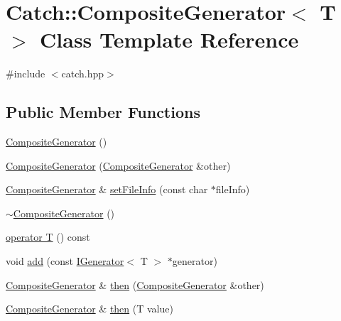 \hypertarget{classCatch_1_1CompositeGenerator}{\section{Catch\-:\-:Composite\-Generator$<$ T $>$ Class Template Reference}
\label{classCatch_1_1CompositeGenerator}
}


{\ttfamily \#include $<$catch.\-hpp$>$}

\subsection*{Public Member Functions}
\begin{DoxyCompactItemize}
\item 
\hyperlink{classCatch_1_1CompositeGenerator_a923398b140371d1783858766864a1af5}{Composite\-Generator} ()
\item 
\hyperlink{classCatch_1_1CompositeGenerator_a21a7070a00e4a6fe021294c356692692}{Composite\-Generator} (\hyperlink{classCatch_1_1CompositeGenerator}{Composite\-Generator} \&other)
\item 
\hyperlink{classCatch_1_1CompositeGenerator}{Composite\-Generator} \& \hyperlink{classCatch_1_1CompositeGenerator_ac3c57cf4ca5472f440bf71e2936bcd4a}{set\-File\-Info} (const char $\ast$file\-Info)
\item 
\hyperlink{classCatch_1_1CompositeGenerator_a5766205abd7004c508c20ddbb5e5555e}{$\sim$\-Composite\-Generator} ()
\item 
\hyperlink{classCatch_1_1CompositeGenerator_aa3f627d84fb256df0404d19d7fd4b784}{operator T} () const 
\item 
void \hyperlink{classCatch_1_1CompositeGenerator_af3774d42ad2d3453d089ca599efe0517}{add} (const \hyperlink{structCatch_1_1IGenerator}{I\-Generator}$<$ T $>$ $\ast$generator)
\item 
\hyperlink{classCatch_1_1CompositeGenerator}{Composite\-Generator} \& \hyperlink{classCatch_1_1CompositeGenerator_a2e03f42df85cdd238aabd77a80b075d5}{then} (\hyperlink{classCatch_1_1CompositeGenerator}{Composite\-Generator} \&other)
\item 
\hyperlink{classCatch_1_1CompositeGenerator}{Composite\-Generator} \& \hyperlink{classCatch_1_1CompositeGenerator_aefdc11bcfccdf07d2db5f0da3ed8758c}{then} (T value)
\end{DoxyCompactItemize}


